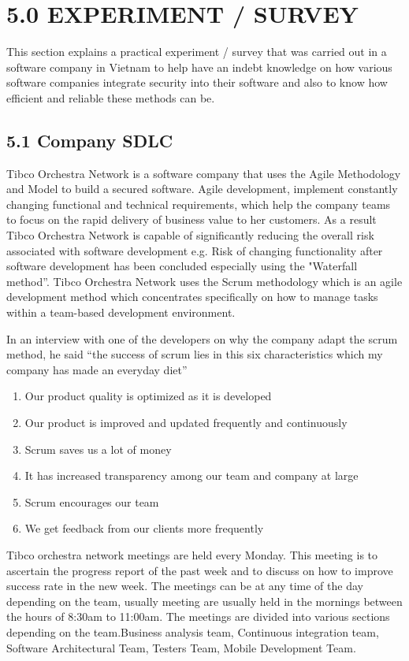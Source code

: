 \documentclass[12pt]{extreport}
\begin{document}
\section*{5.0 	EXPERIMENT / SURVEY}
This section explains a practical experiment / survey that was carried out in a software company in Vietnam to help have an indebt knowledge on how various software companies integrate security into their software and also to know how efficient and reliable these methods can be.

\subsection*{5.1	Company SDLC}
Tibco Orchestra Network is a software company that uses the Agile Methodology and Model to build a secured software. Agile development, implement constantly changing functional and technical requirements, which help the company teams to focus on the rapid delivery of business value to her customers. As a result Tibco Orchestra Network is capable of significantly reducing the overall risk associated with software development e.g. Risk of changing functionality after software development has been concluded especially using the "Waterfall method”. Tibco Orchestra Network uses the Scrum methodology which is an agile development method which concentrates specifically on how to manage tasks within a team-based development environment.

In an interview with one of the developers on why the company adapt the scrum method, he said “the success of scrum lies in this six characteristics which my company has made an everyday diet”

\begin{enumerate}
	\item{Our product quality is optimized as it is developed}
	\item{Our product is improved and updated frequently and continuously }
	\item{Scrum saves us a lot of money}
	\item{It has increased transparency among our team and company at large}
	\item{Scrum encourages our team }
	\item{We get feedback from our clients more frequently}
\end{enumerate}

Tibco orchestra network meetings are held every Monday. This meeting is to ascertain the progress report of the past week and to discuss on how to improve success rate in the new week. The meetings can be at any time of the day depending on the team, usually meeting are usually held in the mornings between the hours of 8:30am to 11:00am. The meetings are divided into various sections depending on the team.Business analysis team, Continuous integration team, Software Architectural Team, Testers Team, Mobile Development Team.
\end{document}
